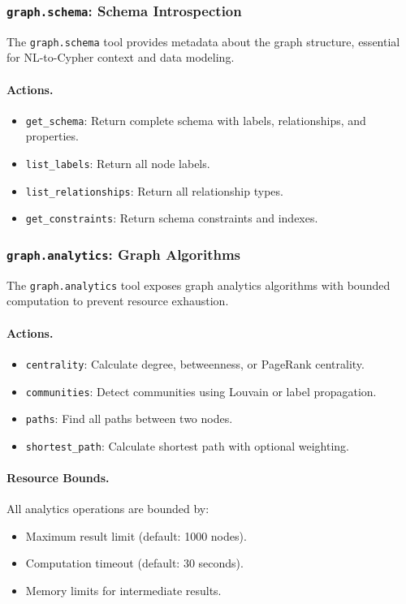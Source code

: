 \subsubsection{\texttt{graph.schema}: Schema Introspection}

The \texttt{graph.schema} tool provides metadata about the graph structure, essential for NL-to-Cypher context and data modeling.

\paragraph{Actions.}
\begin{itemize}
    \item \texttt{get\_schema}: Return complete schema with labels, relationships, and properties.
    \item \texttt{list\_labels}: Return all node labels.
    \item \texttt{list\_relationships}: Return all relationship types.
    \item \texttt{get\_constraints}: Return schema constraints and indexes.
\end{itemize}

\subsubsection{\texttt{graph.analytics}: Graph Algorithms}

The \texttt{graph.analytics} tool exposes graph analytics algorithms with bounded computation to prevent resource exhaustion.

\paragraph{Actions.}
\begin{itemize}
    \item \texttt{centrality}: Calculate degree, betweenness, or PageRank centrality.
    \item \texttt{communities}: Detect communities using Louvain or label propagation.
    \item \texttt{paths}: Find all paths between two nodes.
    \item \texttt{shortest\_path}: Calculate shortest path with optional weighting.
\end{itemize}

\paragraph{Resource Bounds.}
All analytics operations are bounded by:
\begin{itemize}
    \item Maximum result limit (default: 1000 nodes).
    \item Computation timeout (default: 30 seconds).
    \item Memory limits for intermediate results.
\end{itemize}

